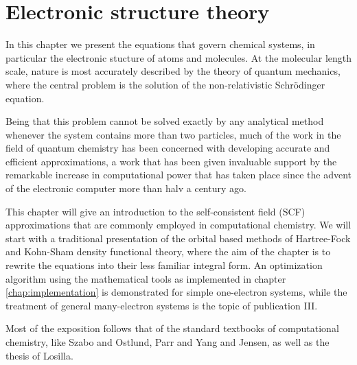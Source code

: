 \chapter{Electronic structure theory}\label{chap:chemistry}
In this chapter we present the equations that govern chemical systems, in particular
the electronic stucture of atoms and molecules. At the molecular length scale, nature
is most accurately described by the theory of quantum mechanics, where the central
problem is the solution of the non-relativistic Schr\"{o}dinger equation.

Being that this problem cannot be solved exactly by any analytical method whenever
the system contains more than two particles, much of the work in the field of quantum
chemistry has been concerned with developing accurate and efficient approximations,
a work that has been given invaluable support by the remarkable increase in 
computational power that has taken place since the advent of the electronic computer 
more than halv a century ago.

This chapter will give an introduction to the self-consistent field (SCF) approximations 
that are commonly employed in computational chemistry. We will start with a traditional 
presentation of the orbital based methods of Hartree-Fock and Kohn-Sham density functional 
theory, where the aim of the chapter is to rewrite the equations into their less familiar 
integral form. An optimization algorithm using the mathematical tools as implemented in 
chapter \ref{chap:implementation} is demonstrated for simple one-electron systems, while 
the treatment of general many-electron systems is the topic of publication III.

Most of the exposition follows that of the standard textbooks of computational chemistry, 
like Szabo and Ostlund\cite{Szabo-Ostlund:1982}, Parr and Yang\cite{Parr-Yang:1989} and 
Jensen\cite{Jensen:2007}, as well as the thesis of Losilla\cite{Losilla_thesis:2013}.

